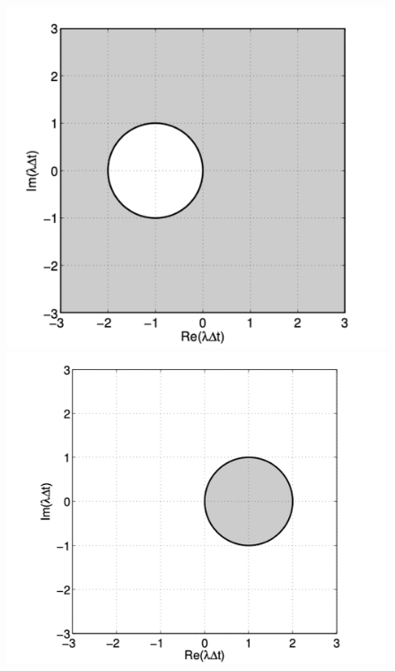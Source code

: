 
\begin{figure}[h]
  \centering
  \begin{minipage}[b]{0.3\linewidth}
    \centering
    \includegraphics[width=\linewidth]{figures/fe_stability.png}
  \end{minipage}
  \hspace{0.01\linewidth}
  \begin{minipage}[b]{0.3\linewidth}
    \centering
    \includegraphics[width=\linewidth]{figures/be_stability.png}

\end{minipage}
\end{figure}
